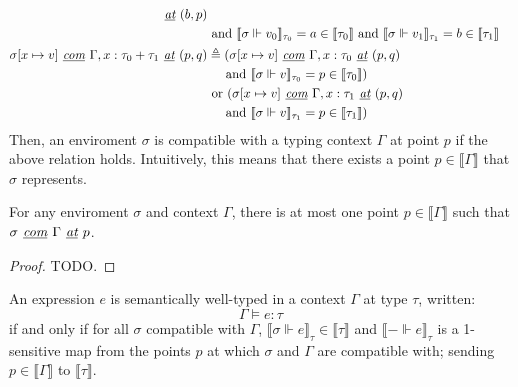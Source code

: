 \begin{definition}
\begin{equation}
\begin{normalsize}
\begin{aligned}[c]
        \textit{ \underline{at} } (b, p) \\
      & \text{ and } \llbracket \sigma \Vdash v_0 \rrbracket_{\tau_0} = a \in
          \llbracket \tau_0 \rrbracket
        \text{ and } \llbracket \sigma \Vdash v_1 \rrbracket_{\tau_1} = b \in
          \llbracket \tau_1 \rrbracket \\
      \sigma[x \mapsto v] \textit{ \underline{com} } \Gamma, x : \tau_0 + \tau_1 \textit{ \underline{at} } (p, q)
      &\triangleq 
      (\sigma[x \mapsto v] \textit{ \underline{com} } \Gamma, x : \tau_0
      \textit{ \underline{at} } (p, q) \\
      &\> \> \> \> \> \text{ and } \llbracket \sigma \Vdash v \rrbracket_{\tau_0} = p
      \in \llbracket \tau_0 \rrbracket) \\
      & \text{ or } (\sigma[x \mapsto v] \textit{ \underline{com} } \Gamma, x :
      \tau_1 \textit{ \underline{at} } (p, q) \\
      &\> \> \> \> \> \text{ and } \llbracket \sigma \Vdash v \rrbracket_{\tau_1} = p
      \in \llbracket \tau_1 \rrbracket) \\
    \end{aligned}
    \end{normalsize}
  \end{equation}
  Then, an enviroment $\sigma$ is compatible with a typing context $\Gamma$ at
  point $p$ if the above relation holds. Intuitively, this means that there
  exists a point $p \in \llbracket \Gamma \rrbracket$ that $\sigma$ represents.
\end{definition}

\begin{lemma}
  For any enviroment $\sigma$ and context $\Gamma$, there is at most one point
  $p \in \llbracket \Gamma \rrbracket$ such that $\sigma \textit{
    \underline{com} } \Gamma \textit { \underline{at} } p$.
\end{lemma}
\begin{proof}
  TODO.
\end{proof}

\begin{definition}
  An expression $e$ is semantically well-typed in a context $\Gamma$ at type
  $\tau$, written:
  $$\Gamma \vDash e : \tau$$
  if and only if for all $\sigma$ compatible with $\Gamma$, $\llbracket \sigma
  \Vdash e \rrbracket_{\tau} \in \llbracket \tau \rrbracket$ and $\llbracket -
  \Vdash e \rrbracket_{\tau}$ is a 1-sensitive map from the points $p$ at which
  $\sigma$ and $\Gamma$ are compatible with; sending $p \in \llbracket \Gamma
  \rrbracket$ to $\llbracket \tau \rrbracket$.
\end{definition}

